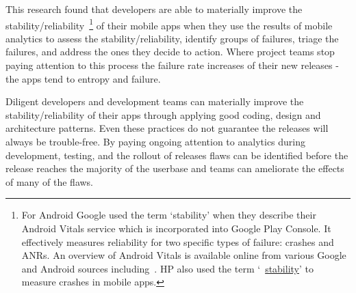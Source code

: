 This research found that developers are able to materially improve the stability/reliability~\footnote{For Android Google used the term `stability' when they describe their Android Vitals service which is incorporated into Google Play Console. It effectively measures reliability for two specific types of failure: crashes and ANRs. An overview of Android Vitals is available online from various Google and Android sources including~\citep{android_vitals_overview_2019, android_vitals_best_practices}. HP also used the term `~\href{glossary-stability}{stability}' to measure crashes in mobile apps.}
%
of their mobile apps when they use the results of mobile analytics to assess the stability/reliability, identify groups of failures, triage the failures, and address the ones they decide to action. Where project teams stop paying attention to this process the failure rate increases of their new releases - the apps tend to entropy and failure.

Diligent developers and development teams can materially improve the stability/reliability of their apps through applying good coding, design and architecture patterns. Even these practices do not guarantee the releases will always be trouble-free. By paying ongoing attention to analytics during development, testing, and the rollout of releases flaws can be identified before the release reaches the majority of the userbase and teams can ameliorate the effects of many of the flaws.

\clearpage 

